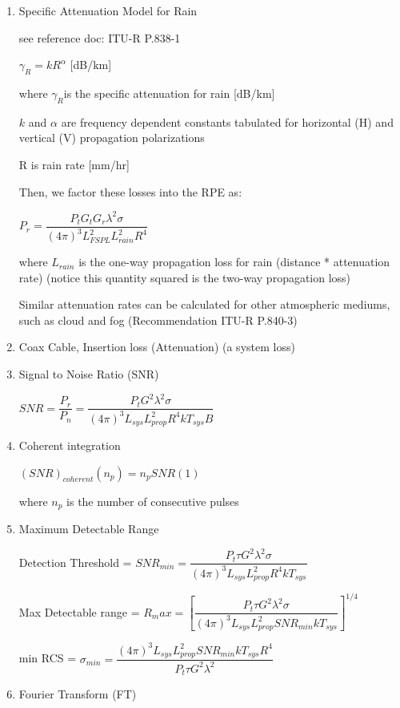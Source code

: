 \documentclass[10pt]{article}
\renewcommand{\frac}{\dfrac}
\begin{document}
\begin{enumerate}
	\item Specific Attenuation Model for Rain
	
	see reference doc: ITU-R P.838-1
	
	\centerline{$\gamma_R = kR^{\alpha}$ [dB/km]}
	
	where $\gamma_R $is the specific attenuation for rain [dB/km]
	
	$k$ and $\alpha$ are frequency dependent constants tabulated for
horizontal (H) and vertical (V) propagation polarizations
	
	R is rain rate [mm/hr]
	
	Then, we factor these losses into the RPE as:
	
	\centerline{$P_r = \frac{P_t G_t G_r {\lambda}^2 \sigma}{(4\pi)^3 L_{FSPL}^2 L_{rain}^2R^4}$}
	
	where $L_{rain}$ is the one-way propagation loss for rain (distance * attenuation rate) (notice this quantity squared is the two-way propagation loss)
	
	Similar attenuation rates can be calculated for other atmospheric mediums, such as cloud and fog (Recommendation ITU-R P.840-3)
	
	\item Coax Cable, Insertion loss (Attenuation)
		(a system loss)
		
	
	\item Signal to Noise Ratio (SNR)
	
	\centerline{$SNR = \frac{P_r}{P_n} = \frac{P_t G^2 \lambda^2 \sigma}{(4\pi)^3 L_{sys} L_{prop}^2 R^4 kT_{sys}B}$}
	
	\item Coherent integration
	
	\centerline{$(SNR)_{coherent}(n_p) = n_p SNR(1)$}
	
	where $n_p$ is the number of consecutive pulses
	
	
	\item Maximum Detectable Range
	
	\centerline{Detection Threshold = $SNR_{min} = \frac{P_t \tau G^2 \lambda^2 \sigma}{(4\pi)^3 L_{sys} L_{prop}^2 R^4 kT_{sys}}$}
	
	\centerline{Max Detectable range  = $R_max = [\frac{P_t \tau G^2 \lambda^2 \sigma}{(4\pi)^3 L_{sys} L_{prop}^2 SNR_{min}kT_{sys}}]^{1/4}$}
	
	\centerline{min RCS = $\sigma_{min} = \frac{(4\pi)^3 L_{sys} L_{prop}^2 SNR_{min}kT_{sys}R^4}{P_t \tau G^2 \lambda^2 }$} 
	
	\item Fourier Transform (FT)
	

\end{enumerate}
\end{document}
